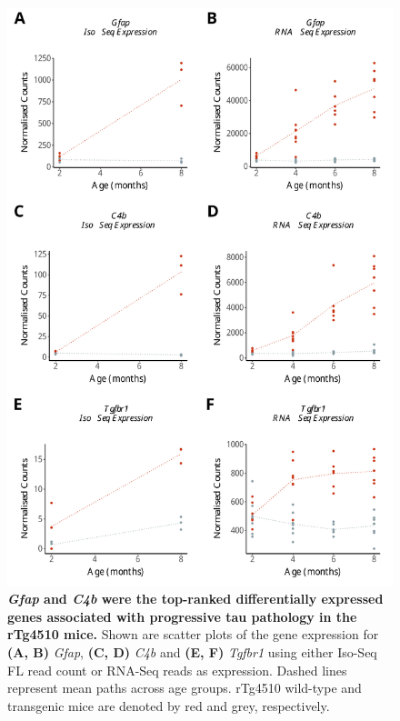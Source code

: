 \begin{figure}[h]
	\begin{center}
		\includegraphics[page=1,scale = 0.55]{Figures/WholeDifferentialAnalysis.pdf}
	\end{center}
	\captionsetup{width=0.95\textwidth}
	\caption[Top-ranked differentially expressed genes associated with rTg4510 genotype]%
	{\textbf{\textit{Gfap} and \textit{C4b} were the top-ranked differentially expressed genes associated with progressive tau pathology in the rTg4510 mice.} Shown are scatter plots of the gene expression for \textbf{(A, B)} \textit{Gfap}, \textbf{(C, D)} \textit{C4b} and \textbf{(E, F)} \textit{Tgfbr1} using either Iso-Seq FL read count or RNA-Seq reads as expression. Dashed lines represent mean paths across age groups. rTg4510 wild-type and transgenic mice are denoted by red and grey, respectively.}   
	\label{fig:whole_dea}
\end{figure}

